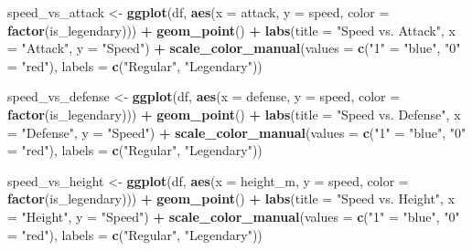 \documentclass[
]{article}
\newenvironment{Shaded}{\begin{snugshade}}{\end{snugshade}}
\newcommand{\AttributeTok}[1]{\textcolor[rgb]{0.13,0.29,0.53}{#1}}
\newcommand{\FunctionTok}[1]{\textcolor[rgb]{0.13,0.29,0.53}{\textbf{#1}}}
\newcommand{\NormalTok}[1]{#1}
\newcommand{\OtherTok}[1]{\textcolor[rgb]{0.56,0.35,0.01}{#1}}
\newcommand{\SpecialCharTok}[1]{\textcolor[rgb]{0.81,0.36,0.00}{\textbf{#1}}}
\newcommand{\StringTok}[1]{\textcolor[rgb]{0.31,0.60,0.02}{#1}}
\begin{document}
\begin{Shaded}
\begin{Highlighting}[]
\NormalTok{speed\_vs\_attack }\OtherTok{\textless{}{-}} \FunctionTok{ggplot}\NormalTok{(df, }\FunctionTok{aes}\NormalTok{(}\AttributeTok{x =}\NormalTok{ attack, }\AttributeTok{y =}\NormalTok{ speed, }\AttributeTok{color =} \FunctionTok{factor}\NormalTok{(is\_legendary))) }\SpecialCharTok{+}
  \FunctionTok{geom\_point}\NormalTok{() }\SpecialCharTok{+}
  \FunctionTok{labs}\NormalTok{(}\AttributeTok{title =} \StringTok{"Speed vs. Attack"}\NormalTok{, }\AttributeTok{x =} \StringTok{"Attack"}\NormalTok{, }\AttributeTok{y =} \StringTok{"Speed"}\NormalTok{) }\SpecialCharTok{+}
  \FunctionTok{scale\_color\_manual}\NormalTok{(}\AttributeTok{values =} \FunctionTok{c}\NormalTok{(}\StringTok{"1"} \OtherTok{=} \StringTok{"blue"}\NormalTok{, }\StringTok{"0"} \OtherTok{=} \StringTok{"red"}\NormalTok{), }\AttributeTok{labels =} \FunctionTok{c}\NormalTok{(}\StringTok{"Regular"}\NormalTok{, }\StringTok{"Legendary"}\NormalTok{))}

\NormalTok{speed\_vs\_defense }\OtherTok{\textless{}{-}} \FunctionTok{ggplot}\NormalTok{(df, }\FunctionTok{aes}\NormalTok{(}\AttributeTok{x =}\NormalTok{ defense, }\AttributeTok{y =}\NormalTok{ speed, }\AttributeTok{color =} \FunctionTok{factor}\NormalTok{(is\_legendary))) }\SpecialCharTok{+}
  \FunctionTok{geom\_point}\NormalTok{() }\SpecialCharTok{+}
  \FunctionTok{labs}\NormalTok{(}\AttributeTok{title =} \StringTok{"Speed vs. Defense"}\NormalTok{, }\AttributeTok{x =} \StringTok{"Defense"}\NormalTok{, }\AttributeTok{y =} \StringTok{"Speed"}\NormalTok{) }\SpecialCharTok{+}
  \FunctionTok{scale\_color\_manual}\NormalTok{(}\AttributeTok{values =} \FunctionTok{c}\NormalTok{(}\StringTok{"1"} \OtherTok{=} \StringTok{"blue"}\NormalTok{, }\StringTok{"0"} \OtherTok{=} \StringTok{"red"}\NormalTok{), }\AttributeTok{labels =} \FunctionTok{c}\NormalTok{(}\StringTok{"Regular"}\NormalTok{, }\StringTok{"Legendary"}\NormalTok{))}

\NormalTok{speed\_vs\_height }\OtherTok{\textless{}{-}} \FunctionTok{ggplot}\NormalTok{(df, }\FunctionTok{aes}\NormalTok{(}\AttributeTok{x =}\NormalTok{ height\_m, }\AttributeTok{y =}\NormalTok{ speed, }\AttributeTok{color =} \FunctionTok{factor}\NormalTok{(is\_legendary))) }\SpecialCharTok{+}
  \FunctionTok{geom\_point}\NormalTok{() }\SpecialCharTok{+}
  \FunctionTok{labs}\NormalTok{(}\AttributeTok{title =} \StringTok{"Speed vs. Height"}\NormalTok{, }\AttributeTok{x =} \StringTok{"Height"}\NormalTok{, }\AttributeTok{y =} \StringTok{"Speed"}\NormalTok{) }\SpecialCharTok{+}
  \FunctionTok{scale\_color\_manual}\NormalTok{(}\AttributeTok{values =} \FunctionTok{c}\NormalTok{(}\StringTok{"1"} \OtherTok{=} \StringTok{"blue"}\NormalTok{, }\StringTok{"0"} \OtherTok{=} \StringTok{"red"}\NormalTok{), }\AttributeTok{labels =} \FunctionTok{c}\NormalTok{(}\StringTok{"Regular"}\NormalTok{, }\StringTok{"Legendary"}\NormalTok{))}


\end{Highlighting}
\end{Shaded}
\end{document}
